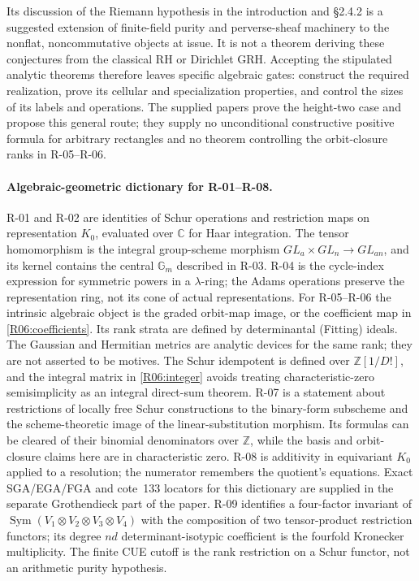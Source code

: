 \documentclass[11pt,a4paper]{article}
\theoremstyle{definition}\newtheorem{definition}{Definition}
\begin{document}
Its discussion of the Riemann hypothesis in the introduction and
\S2.4.2 is a suggested extension of finite-field purity and
perverse-sheaf machinery to the nonflat, noncommutative objects at
issue. It is not a theorem deriving these conjectures from the
classical RH or Dirichlet GRH. Accepting the stipulated analytic
theorems therefore leaves specific algebraic gates: construct the
required realization, prove its cellular and specialization
properties, and control the sizes of its labels and operations.
The supplied papers prove the height-two case and propose this
general route; they supply no unconditional constructive positive
formula for arbitrary rectangles and no theorem controlling the
orbit-closure ranks in R-05--R-06.

\paragraph{Algebraic-geometric dictionary for R-01--R-08.}
R-01 and R-02 are identities of Schur operations and restriction maps
on representation $K_0$, evaluated over $\mathbb C$ for Haar integration.
The tensor homomorphism is the integral group-scheme morphism
$GL_a\times GL_n\to GL_{an}$, and its kernel contains the central
$\mathbb G_m$ described in R-03. R-04 is the cycle-index expression
for symmetric powers in a $\lambda$-ring; the Adams operations preserve
the representation ring, not its cone of actual representations.
For R-05--R-06 the intrinsic algebraic object is the graded orbit-map
image, or the coefficient map in \eqref{R06:coefficients}. Its rank
strata are defined by determinantal (Fitting) ideals. The Gaussian
and Hermitian metrics are analytic devices for the same rank; they
are not asserted to be motives. The Schur idempotent is defined over
$\mathbb Z[1/D!]$, and the integral matrix in \eqref{R06:integer}
avoids treating characteristic-zero semisimplicity as an integral
direct-sum theorem. R-07 is a statement about restrictions of locally
free Schur constructions to the binary-form subscheme and the
scheme-theoretic image of the linear-substitution morphism. Its
formulas can be cleared of their binomial denominators over
$\mathbb Z$, while the basis and orbit-closure claims here are in
characteristic zero. R-08 is additivity in equivariant $K_0$ applied
to a resolution; the numerator remembers the quotient's equations.
Exact SGA/EGA/FGA and cote~133 locators for this dictionary are supplied
in the separate Grothendieck part of the paper.
R-09 identifies a four-factor invariant of
$\operatorname{Sym}(V_1\otimes V_2\otimes V_3\otimes V_4)$ with the
composition of two tensor-product restriction functors; its degree
$nd$ determinant-isotypic coefficient is the fourfold Kronecker
multiplicity. The finite CUE cutoff is the rank restriction on a
Schur functor, not an arithmetic purity hypothesis.
\end{document}
